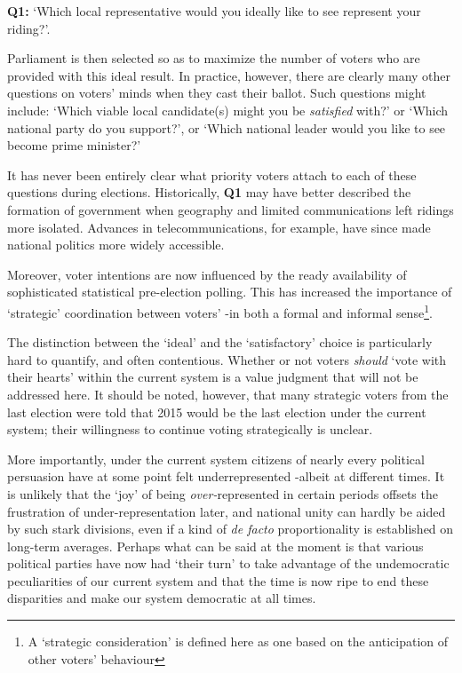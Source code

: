 \documentclass[DIV=calc, paper=a4, fontsize=11pt, twocolumn]{scrartcl}	 %
\begin{document}
\begin{tcolorbox}[colback=white!5!white,colframe=blue!55!black]
{\textbf{Q1:} } `Which local representative would you ideally like to see represent your riding?'. 
\end{tcolorbox}

Parliament is then selected so as to maximize the number of voters who are provided with this ideal result. 
In practice, however, there are clearly many other questions on voters' minds when they cast their ballot. 
Such questions might include: `Which viable local candidate(s) might you be \emph{satisfied} with?'  or `Which national party do you support?', or `Which national leader would you like to see become prime minister?' 

It has never been entirely clear what priority voters attach to each of these questions during elections. Historically, \textbf{Q1} may have better described the formation of government when geography and limited communications left ridings more isolated.
Advances in telecommunications, for example, have since made national politics more widely accessible. 

Moreover, voter intentions are now influenced by the ready availability of sophisticated statistical pre-election polling. This has increased the importance of `strategic' coordination  between voters' \--in both a formal\cite{Leadnow_environics} and informal sense\footnote{A `strategic  consideration' is defined here as one based on the anticipation of other voters' behaviour}. 


The distinction between the `ideal' and the `satisfactory' choice is particularly hard to quantify, and often contentious.
Whether or not voters \emph{should} `vote with their hearts' within the current system is a value judgment that will not be addressed here. It should be noted, however, that many strategic voters from the last election were told that 2015 would be the last election under the current system;  their willingness to continue voting strategically is unclear.

More importantly, under the current system citizens of nearly every political persuasion have at some point felt underrepresented \--albeit at different times. It is unlikely that the `joy' of being \emph{over-}represented in certain periods offsets the frustration of under-representation later, and
 national unity can hardly be aided by such stark divisions, even if a kind of \emph{ de facto} proportionality is established on long-term averages. 
Perhaps what can be said at the moment is that various political parties have now had `their turn' to take advantage of the undemocratic peculiarities of our current system and that the time is now ripe to end these disparities and make our system democratic at all times. 
\end{document}
